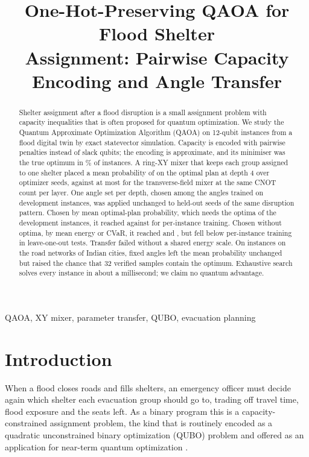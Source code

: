 \documentclass[conference]{IEEEtran}
\begin{document}
\title{One-Hot-Preserving QAOA for Flood Shelter\\
Assignment: Pairwise Capacity Encoding and Angle Transfer}

\author{
}

\maketitle

\begin{abstract}
Shelter assignment after a flood disruption is a small assignment problem with capacity inequalities that is often proposed for quantum optimization. We study the Quantum Approximate Optimization Algorithm (QAOA) on 12-qubit instances from a flood digital twin by exact statevector simulation. Capacity is encoded with pairwise penalties instead of slack qubits; the encoding is approximate, and its minimiser was the true optimum in \QuboExact\% of instances. A ring-XY mixer that keeps each group assigned to one shelter placed a mean probability of \SeedXYMean{} on the optimal plan at depth 4 over \NSeeds{} optimizer seeds, against at most \SeedXMax{} for the transverse-field mixer at the same CNOT count per layer. One angle set per depth, chosen among the angles trained on \NPaired{} development instances, was applied unchanged to \HoN{} held-out seeds of the same disruption pattern. Chosen by mean optimal-plan probability, which needs the optima of the development instances, it reached \SelPopt{} against \SelTrained{} for per-instance training. Chosen without optima, by mean energy or CVaR, it reached \SelEn{} and \SelCv, but fell below per-instance training in leave-one-out tests. Transfer failed without a shared energy scale. On \CityN{} instances on the road networks of \CityNCities{} Indian cities, fixed angles left the mean probability unchanged but raised the chance that 32 verified samples contain the optimum. Exhaustive search solves every instance in about a millisecond; we claim no quantum advantage.
\end{abstract}

\begin{IEEEkeywords}
QAOA, XY mixer, parameter transfer, QUBO, evacuation planning
\end{IEEEkeywords}

\section{Introduction}
When a flood closes roads and fills shelters, an emergency officer must decide again which shelter each evacuation group should go to, trading off travel time, flood exposure and the seats left. As a binary program this is a capacity-constrained assignment problem, the kind that is routinely encoded as a quadratic unconstrained binary optimization (QUBO) problem \cite{Lucas2014,Glover2019} and offered as an application for near-term quantum optimization \cite{Cadelina2024,Abbas2024}.
\end{document}
